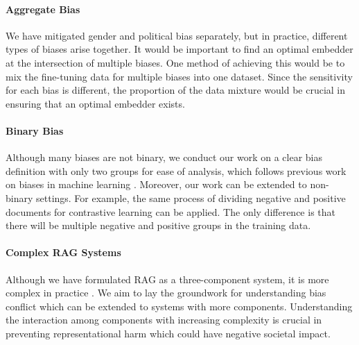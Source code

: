 \paragraph{Aggregate Bias}
We have mitigated gender and political bias separately, but in practice, different types of biases arise together. It would be important to find an optimal embedder at the intersection of multiple biases. One method of achieving this would be to mix the fine-tuning data for multiple biases into one dataset. Since the sensitivity for each bias is different, the proportion of the data mixture would be crucial in ensuring that an optimal embedder exists.

\paragraph{Binary Bias}
Although many biases are not binary, we conduct our work on a clear bias definition with only two groups for ease of analysis, which follows previous work on biases in machine learning \citep{nadeem2020stereoset,liang2021towards,kotek2023gender,zhao2024beyond,hu2024no,wu2024does}. Moreover, our work can be extended to non-binary settings. For example, the same process of dividing negative and positive documents for contrastive learning can be applied. The only difference is that there will be multiple negative and positive groups in the training data.

\paragraph{Complex RAG Systems}
Although we have formulated RAG as a three-component system, it is more complex in practice \citep{simon2024methodology,gao2024modular}. We aim to lay the groundwork for understanding bias conflict which can be extended to systems with more components. Understanding the interaction among components with increasing complexity is crucial in preventing representational harm which could have negative societal impact.